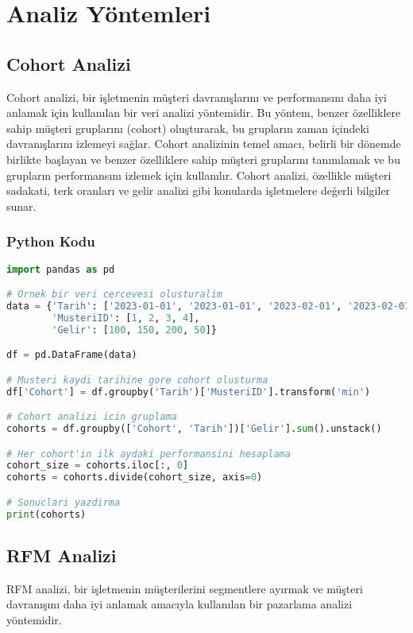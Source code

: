 \section{Analiz Yöntemleri}
\subsection{Cohort Analizi}
Cohort analizi, bir işletmenin müşteri davranışlarını ve performansını daha iyi anlamak için kullanılan bir veri analizi yöntemidir. Bu yöntem, benzer özelliklere sahip müşteri gruplarını (cohort) oluşturarak, bu grupların zaman içindeki davranışlarını izlemeyi sağlar. Cohort analizinin temel amacı, belirli bir dönemde birlikte başlayan ve benzer özelliklere sahip müşteri gruplarını tanımlamak ve bu grupların performansını izlemek için kullanılır. Cohort analizi, özellikle müşteri sadakati, terk oranları ve gelir analizi gibi konularda işletmelere değerli bilgiler sunar.

\subsubsection{Python Kodu}

\begin{lstlisting}[language=Python, caption=Cohort analizi örneği]
import pandas as pd

# Ornek bir veri cercevesi olusturalim
data = {'Tarih': ['2023-01-01', '2023-01-01', '2023-02-01', '2023-02-01'],
        'MusteriID': [1, 2, 3, 4],
        'Gelir': [100, 150, 200, 50]}

df = pd.DataFrame(data)

# Musteri kaydi tarihine gore cohort olusturma
df['Cohort'] = df.groupby('Tarih')['MusteriID'].transform('min')

# Cohort analizi icin gruplama
cohorts = df.groupby(['Cohort', 'Tarih'])['Gelir'].sum().unstack()

# Her cohort'in ilk aydaki performansini hesaplama
cohort_size = cohorts.iloc[:, 0]
cohorts = cohorts.divide(cohort_size, axis=0)

# Sonuclari yazdirma
print(cohorts)
\end{lstlisting}

\newpage

\subsection{RFM Analizi}
RFM analizi, bir işletmenin müşterilerini segmentlere ayırmak ve müşteri davranışını daha iyi anlamak amacıyla kullanılan bir pazarlama analizi yöntemidir.

